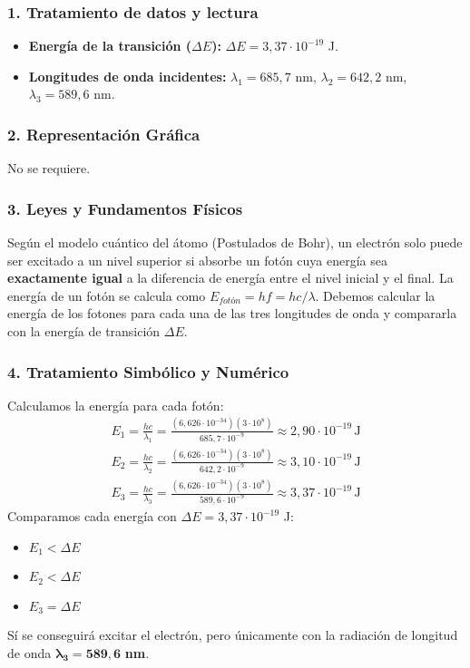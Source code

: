 \subsubsection*{1. Tratamiento de datos y lectura}
\begin{itemize}
    \item \textbf{Energía de la transición ($\Delta E$):} $\Delta E = 3,37 \cdot 10^{-19}$ J.
    \item \textbf{Longitudes de onda incidentes:} $\lambda_1=685,7$ nm, $\lambda_2=642,2$ nm, $\lambda_3=589,6$ nm.
\end{itemize}

\subsubsection*{2. Representación Gráfica}
No se requiere.

\subsubsection*{3. Leyes y Fundamentos Físicos}
Según el modelo cuántico del átomo (Postulados de Bohr), un electrón solo puede ser excitado a un nivel superior si absorbe un fotón cuya energía sea \textbf{exactamente igual} a la diferencia de energía entre el nivel inicial y el final.
La energía de un fotón se calcula como $E_{fotón} = hf = hc/\lambda$.
Debemos calcular la energía de los fotones para cada una de las tres longitudes de onda y compararla con la energía de transición $\Delta E$.

\subsubsection*{4. Tratamiento Simbólico y Numérico}
Calculamos la energía para cada fotón:
\begin{gather*}
    E_1 = \frac{hc}{\lambda_1} = \frac{(6,626\cdot10^{-34})(3\cdot10^8)}{685,7\cdot10^{-9}} \approx 2,90 \cdot 10^{-19} \, \text{J} \\
    E_2 = \frac{hc}{\lambda_2} = \frac{(6,626\cdot10^{-34})(3\cdot10^8)}{642,2\cdot10^{-9}} \approx 3,10 \cdot 10^{-19} \, \text{J} \\
    E_3 = \frac{hc}{\lambda_3} = \frac{(6,626\cdot10^{-34})(3\cdot10^8)}{589,6\cdot10^{-9}} \approx 3,37 \cdot 10^{-19} \, \text{J}
\end{gather*}
Comparamos cada energía con $\Delta E = 3,37 \cdot 10^{-19}$ J:
\begin{itemize}
    \item $E_1 < \Delta E$
    \item $E_2 < \Delta E$
    \item $E_3 = \Delta E$
\end{itemize}
\begin{cajaresultado}
    Sí se conseguirá excitar el electrón, pero únicamente con la radiación de longitud de onda $\boldsymbol{\lambda_3 = 589,6}$ \textbf{nm}.
\end{cajaresultado}

